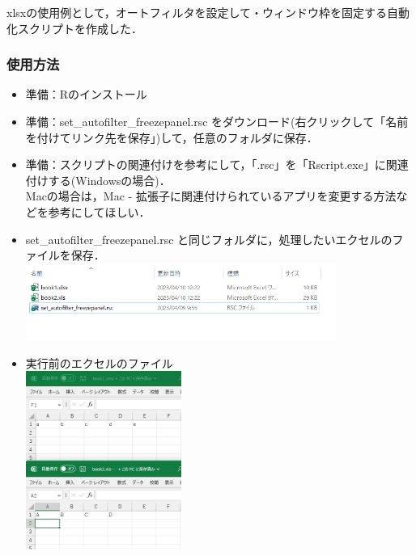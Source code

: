 \documentclass[
]{article}
\providecommand{\tightlist}{%
  \setlength{\itemsep}{0pt}\setlength{\parskip}{0pt}}
\begin{document}
xlsxの使用例として，オートフィルタを設定して・ウィンドウ枠を固定する自動化スクリプトを作成した．

\hypertarget{ux4f7fux7528ux65b9ux6cd5}{%
\subsubsection{使用方法}\label{ux4f7fux7528ux65b9ux6cd5}}

\begin{itemize}
\tightlist
\item
  準備：Rのインストール\\
\item
  準備：set\_autofilter\_freezepanel.rsc
  をダウンロード(右クリックして「名前を付けてリンク先を保存」)して，任意のフォルダに保存．\\
\item
  準備：スクリプトの関連付けを参考にして，「.rsc」を「Rscript.exe」に関連付けする(Windowsの場合)．\\
  Macの場合は，Mac - 拡張子に関連付けられているアプリを変更する方法などを参考にしてほしい．\\
\item
  set\_autofilter\_freezepanel.rsc と同じフォルダに，処理したいエクセルのファイルを保存．\\
  \includegraphics[width=0.8\textwidth,height=\textheight]{img/set_autofilter_freezepanel01.png}\\
\item
  実行前のエクセルのファイル\\
  \includegraphics[width=0.4\textwidth,height=\textheight]{img/set_autofilter_freezepanel02.png}\\

\end{itemize}
\end{document}
